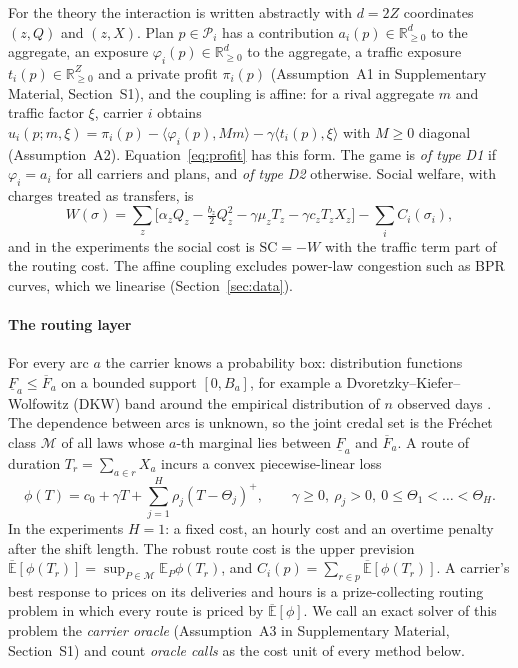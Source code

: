 \documentclass[preprint,11pt]{elsarticle}
\theoremstyle{definition}
\theoremstyle{remark}
\newcommand{\R}{\mathbb{R}}
\newcommand{\E}{\mathbb{E}}
\newcommand{\cP}{\mathcal{P}}
\newcommand{\cM}{\mathcal{M}}
\newcommand{\Eu}{\overline{\mathbb{E}}}
\newcommand{\Fl}{\underline{F}}
\newcommand{\Fu}{\overline{F}}
\newcommand{\pos}[1]{\left(#1\right)^{+}}
\newcommand{\ip}[2]{\langle #1,#2\rangle}
\newcommand{\SM}[1]{Supplementary Material, Section~#1}
\begin{document}
For the theory the interaction is written abstractly with $d=2Z$ coordinates $(z,Q)$ and $(z,X)$. Plan $p\in\cP_i$ has a contribution $a_i(p)\in\R^d_{\ge0}$ to the aggregate, an exposure $\varphi_i(p)\in\R^d_{\ge0}$ to the aggregate, a traffic exposure $t_i(p)\in\R^Z_{\ge0}$ and a private profit $\pi_i(p)$ (Assumption~A1 in \SM{S1}), and the coupling is affine: for a rival aggregate $m$ and traffic factor $\xi$, carrier $i$ obtains $u_i(p;m,\xi)=\pi_i(p)-\ip{\varphi_i(p)}{Mm}-\gamma\ip{t_i(p)}{\xi}$ with $M\ge0$ diagonal (Assumption~A2). Equation~\eqref{eq:profit} has this form. The game is \emph{of type D1} if $\varphi_i=a_i$ for all carriers and plans, and \emph{of type D2} otherwise. Social welfare, with charges treated as transfers, is
\begin{equation}\label{eq:welfare}
W(\sigma)=\sum_z\big[\alpha_zQ_z-\tfrac{b_z}{2}Q_z^2-\gamma\mu_zT_z-\gamma c_zT_zX_z\big]-\sum_iC_i(\sigma_i),
\end{equation}
and in the experiments the social cost is $\mathrm{SC}=-W$ with the traffic term part of the routing cost. The affine coupling excludes power-law congestion such as BPR curves, which we linearise (Section~\ref{sec:data}).

\paragraph{The routing layer}\label{sec:routing} For every arc $a$ the carrier knows a probability box: distribution functions $\Fl_a\le\Fu_a$ on a bounded support $[0,B_a]$, for example a Dvoretzky--Kiefer--Wolfowitz (DKW) band around the empirical distribution of $n$ observed days \citep{DKW1956}. The dependence between arcs is unknown, so the joint credal set is the Fr\'echet class $\cM$ of all laws whose $a$-th marginal lies between $\Fl_a$ and $\Fu_a$. A route of duration $T_r=\sum_{a\in r}X_a$ incurs a convex piecewise-linear loss
\begin{equation}\label{eq:loss}
\phi(T)=c_0+\gamma T+\textstyle\sum_{j=1}^{H}\rho_j\pos{T-\Theta_j},\qquad \gamma\ge0,\ \rho_j>0,\ 0\le\Theta_1<\dots<\Theta_H.
\end{equation}
In the experiments $H=1$: a fixed cost, an hourly cost and an overtime penalty after the shift length. The robust route cost is the upper prevision $\Eu[\phi(T_r)]=\sup_{P\in\cM}\E_P\phi(T_r)$, and $C_i(p)=\sum_{r\in p}\Eu[\phi(T_r)]$. A carrier's best response to prices on its deliveries and hours is a prize-collecting routing problem in which every route is priced by $\Eu[\phi]$. We call an exact solver of this problem the \emph{carrier oracle} (Assumption~A3 in \SM{S1}) and count \emph{oracle calls} as the cost unit of every method below.
\end{document}
